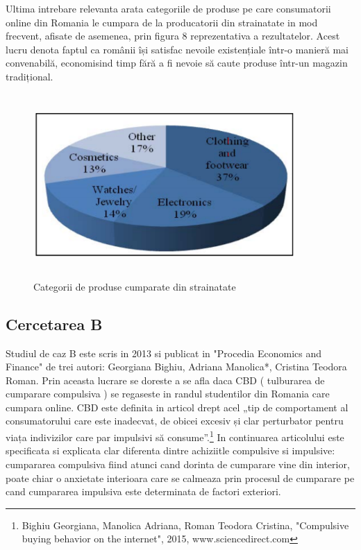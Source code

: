 \documentclass[a4paper, 12pt]{article}
\begin{document}
	\quad Ultima intrebare relevanta arata categoriile de produse pe care consumatorii online din Romania le cumpara de la producatorii din strainatate in mod frecvent, afisate de asemenea, prin figura 8 reprezentativa a rezultatelor. Acest lucru denota faptul ca românii își satisfac nevoile existențiale într-o manieră mai convenabilă, economisind timp fără a fi nevoie să caute produse într-un magazin tradițional.
		\begin{figure}[!htb]
			\centering
			\includegraphics[width=10cm, height=7cm]{"figures/eigth.png"}
			\caption{Categorii de produse cumparate din strainatate}\label{fig:eigth}
		\end{figure}
	
	\subsection {Cercetarea B}
	\qquad Studiul de caz B este scris in 2013 si publicat in "Procedia Economics and Finance" de trei autori: Georgiana Bighiu, Adriana Manolica*, Cristina Teodora Roman. Prin aceasta lucrare se doreste a se afla daca CBD ( tulburarea de cumparare compulsiva ) se regaseste in randul studentilor din Romania care cumpara online. CBD este definita in articol drept acel „tip de comportament al consumatorului care este inadecvat, de obicei excesiv și clar perturbator pentru viața indivizilor care par impulsivi să consume”.\footnote{Bighiu Georgiana, Manolica Adriana, Roman Teodora Cristina, "Compulsive buying behavior on the internet", 2015, www.sciencedirect.com} In continuarea articolului  este specificata si explicata clar diferenta dintre achiziitle compulsive si impulsive: cumpararea compulsiva fiind atunci cand dorinta de cumparare vine din interior, poate chiar o anxietate interioara care se calmeaza prin procesul de cumparare pe cand cumpararea impulsiva este determinata de factori exteriori.
	
\end{document}
